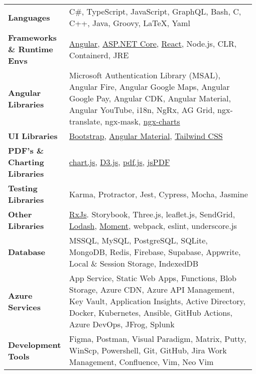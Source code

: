 {
  \setlength{\tabcolsep}{0pt}
  \begin{tabular}{@{}p{0.23\linewidth}@{\hspace{5pt}}p{0.75\linewidth}@{}}
    \textbf{Languages} & {C\#, TypeScript, JavaScript, GraphQL, Bash, C, C++, Java, Groovy, LaTeX, Yaml} \\
    \textbf{Frameworks \& Runtime Envs} & {\href{https://angular.io/}{Angular}, \href{https://dotnet.microsoft.com/apps/aspnet}{ASP.NET Core}, \href{https://reactjs.org/}{React}, Node.js, CLR, Containerd, JRE} \\
    \textbf{Angular Libraries} & {Microsoft Authentication Library (MSAL), Angular Fire, Angular Google Maps, Angular Google Pay, Angular CDK, Angular Material, Angular YouTube, i18n, NgRx, AG Grid, ngx-translate, ngx-mask, \href{https://swimlane.github.io/ngx-charts/}{ngx-charts}} \\
    \textbf{UI Libraries} & {\href{https://getbootstrap.com/}{Bootstrap}, \href{https://material.angular.io/}{Angular Material}, \href{https://tailwindcss.com/}{Tailwind CSS}}\\
    \textbf{PDF's \& Charting Libraries} & {\href{https://www.chartjs.org/}{chart.js}, \href{https://d3js.org/}{D3.js}, \href{https://mozilla.github.io/pdf.js/}{pdf.js},  \href{https://github.com/parallax/jsPDF}{jsPDF}}\\
    \textbf{Testing Libraries} & {Karma, Protractor, Jest, Cypress, Mocha, Jasmine} \\
    \textbf{Other Libraries} & {\href{https://rxjs.dev/}{RxJs}. Storybook, Three.js, leaflet.js, SendGrid, \href{https://lodash.com/}{Lodash},  \href{https://momentjs.com/}{Moment}, webpack, eslint, underscore.js}\\
    \textbf{Database} & {MSSQL, MySQL, PostgreSQL, SQLite, MongoDB, Redis, Firebase, Supabase, Appwrite, Local \& Session Storage, IndexedDB} \\
    \textbf{Azure Services} & {App Service, Static Web Apps, Functions, Blob Storage, Azure CDN, Azure API Management, Key Vault, Application Insights, Active Directory, Docker, Kubernetes, Ansible, GitHub Actions, Azure DevOps, JFrog, Splunk} \\
    \textbf{Development Tools} & {Figma, Postman, Visual Paradigm, Matrix, Putty, WinScp, Powershell, Git, GitHub, Jira Work Management, Confluence, Vim, Neo Vim} \\
  \end{tabular}
}
